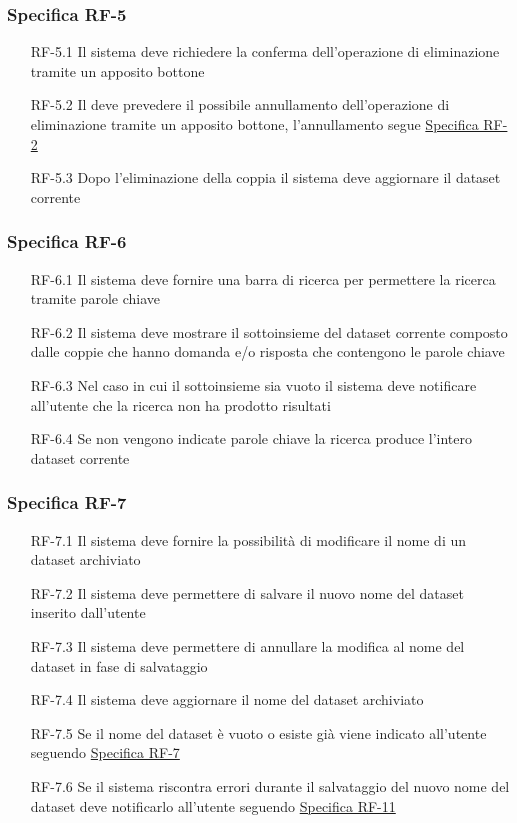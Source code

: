 \subsubsection{Specifica RF-5}
\label{subsubsec:RF-5}
\begin{enumerate}
    \item[RF-5.1] Il sistema deve richiedere la conferma dell'operazione di eliminazione tramite un apposito bottone
    \item[RF-5.2] Il deve prevedere il possibile annullamento dell'operazione di eliminazione tramite un apposito bottone, l'annullamento segue \hyperref[subsubsec:RF-2]{Specifica RF-2}
    \item[RF-5.3] Dopo l'eliminazione della coppia il sistema deve aggiornare il dataset corrente
\end{enumerate}

\subsubsection{Specifica RF-6}
\label{subsubsec:RF-6}
\begin{enumerate}
    \item[RF-6.1] Il sistema deve fornire una barra di ricerca per permettere la ricerca tramite parole chiave 
    \item[RF-6.2] Il sistema deve mostrare il sottoinsieme del dataset corrente composto dalle coppie che hanno domanda e/o risposta che contengono le parole chiave
    \item[RF-6.3] Nel caso in cui il sottoinsieme sia vuoto il sistema deve notificare all'utente che la ricerca non ha prodotto risultati
    \item[RF-6.4] Se non vengono indicate parole chiave la ricerca produce l'intero dataset corrente
\end{enumerate}

\subsubsection{Specifica RF-7}
\label{subsubsec:RF-7}
\begin{enumerate}
    \item[RF-7.1] Il sistema deve fornire la possibilità di modificare il nome di un dataset archiviato 
    \item[RF-7.2] Il sistema deve permettere di salvare il nuovo nome del dataset inserito dall'utente
    \item[RF-7.3] Il sistema deve permettere di annullare la modifica al nome del dataset in fase di salvataggio
    \item[RF-7.4] Il sistema deve aggiornare il nome del dataset archiviato
    \item[RF-7.5] Se il nome del dataset è vuoto o esiste già viene indicato all'utente seguendo \hyperref[subsubsec:RF-7]{Specifica RF-7}
    \item[RF-7.6] Se il sistema riscontra errori durante il salvataggio del nuovo nome del dataset deve notificarlo all'utente seguendo \hyperref[subsubsec:RF-11]{Specifica RF-11}
\end{enumerate}


